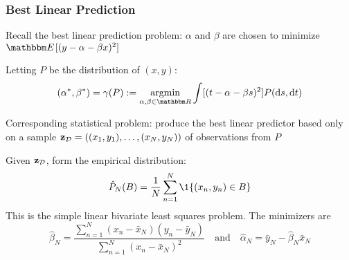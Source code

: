 \begin{frame}\frametitle{Best Linear Prediction}
    
    \vspace{2em}
    Recall the best linear prediction problem: $\alpha$
    and $\beta$ are chosen to minimize $\EE[ (y - \alpha - \beta x)^2 ]$
    
    \vspace{.7em}
    Letting $P$ be the distribution of $(x, y)$:
    \begin{equation*}
        \label{eq:lstmp}
        (\alpha^*, \beta^*)
        = \gamma(P) := \argmin_{\alpha, \beta \in \RR} \int [ (t - \alpha - \beta
        s)^2 ] P(\diff s, \diff t)
    \end{equation*}
    
\end{frame}

\begin{frame}

    \vspace{2em}
    Corresponding statistical problem: produce the best linear predictor based
    only on a sample $\mathbf{z}_{\mathcal D} = ((x_1, y_1), \ldots, (x_N, y_N))$ of observations
    from $P$
    
    \vspace{.7em}
    Given $\mathbf{z}_{\mathcal D}$, form the empirical
    distribution:
    \begin{equation*}
        \hat P_N(B) = \frac{1}{N} \sum_{n=1}^N \1\{(x_n, y_n) \in B\}
    \end{equation*}
    This is the simple linear bivariate least squares problem.  The minimizers are 
    \begin{equation*}
        \label{eq:solse}
        \hat \beta_N = \frac{\sum_{n=1}^N (x_n - \bar x_N)(y_n - \bar y_N)}
                        {\sum_{n=1}^N (x_n - \bar x_N)^2}
        \quad \text{and} \quad
        \hat \alpha_N = \bar y_N 
            - \hat \beta_N \bar x_N
    \end{equation*}
    
\end{frame}


